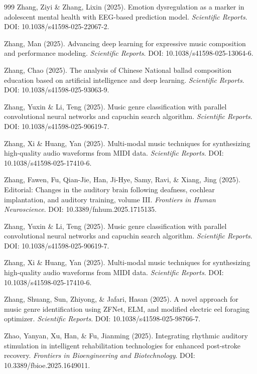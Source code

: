 \documentclass[9pt,onecolumn]{article}
\begin{document}
\begin{thebibliography}{999}
Zhang, Ziyi \& Zhang, Lixin (2025). Emotion dysregulation as a marker in adolescent mental health with EEG-based prediction model. \textit{Scientific Reports}. DOI: 10.1038/s41598-025-22067-2.

Zhang, Man (2025). Advancing deep learning for expressive music composition and performance modeling. \textit{Scientific Reports}. DOI: 10.1038/s41598-025-13064-6.

Zhang, Chao (2025). The analysis of Chinese National ballad composition education based on artificial intelligence and deep learning. \textit{Scientific Reports}. DOI: 10.1038/s41598-025-93063-9.

Zhang, Yuxin \& Li, Teng (2025). Music genre classification with parallel convolutional neural networks and capuchin search algorithm. \textit{Scientific Reports}. DOI: 10.1038/s41598-025-90619-7.

Zhang, Xi \& Huang, Yan (2025). Multi-modal music techniques for synthesizing high-quality audio waveforms from MIDI data. \textit{Scientific Reports}. DOI: 10.1038/s41598-025-17410-6.

Zhang, Fawen, Fu, Qian-Jie, Han, Ji-Hye, Samy, Ravi, \& Xiang, Jing (2025). Editorial: Changes in the auditory brain following deafness, cochlear implantation, and auditory training, volume III. \textit{Frontiers in Human Neuroscience}. DOI: 10.3389/fnhum.2025.1715135.

Zhang, Yuxin \& Li, Teng (2025). Music genre classification with parallel convolutional neural networks and capuchin search algorithm. \textit{Scientific Reports}. DOI: 10.1038/s41598-025-90619-7.

Zhang, Xi \& Huang, Yan (2025). Multi-modal music techniques for synthesizing high-quality audio waveforms from MIDI data. \textit{Scientific Reports}. DOI: 10.1038/s41598-025-17410-6.

Zhang, Shuang, Sun, Zhiyong, \& Jafari, Hasan (2025). A novel approach for music genre identification using ZFNet, ELM, and modified electric eel foraging optimizer. \textit{Scientific Reports}. DOI: 10.1038/s41598-025-98766-7.

Zhao, Yanyan, Xu, Han, \& Fu, Jianming (2025). Integrating rhythmic auditory stimulation in intelligent rehabilitation technologies for enhanced post-stroke recovery. \textit{Frontiers in Bioengineering and Biotechnology}. DOI: 10.3389/fbioe.2025.1649011.


\end{thebibliography}
\end{document}
